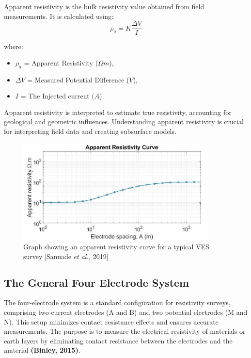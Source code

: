 \documentclass[12pt,a4paper]{report}
\begin{document}
Apparent resistivity is the bulk resistivity value obtained from field measurements. It is calculated using:
\begin{equation}
\rho_a = K \frac{\Delta V}{I}
\end{equation}

where:
\begin{itemize}
    \item $\rho_a$ = Apparent Resistivity ($\Omega m$),
    \item $\Delta V$ = Measured Potential Difference ($V$),
    \item $I$ = The Injected current ($A$).
\end{itemize}

Apparent resistivity is interpreted to estimate true resistivity, accounting for geological and geometric influences. Understanding apparent resistivity is crucial for interpreting field data and creating subsurface models.

\begin{figure}[H]
    \centering
    \includegraphics[width=0.90\textwidth]{Apparent-resistivity-curve-for-a-two-layer-model.png}
    \caption{Graph showing an apparent resistivity curve for a typical VES survey [Sanuade \textit{et al.,} 2019]}
\end{figure}

\subsection{The General Four Electrode System}

The four-electrode system is a standard configuration for resistivity surveys, comprising two current electrodes (A and B) and two potential electrodes (M and N). This setup minimizes contact resistance effects and ensures accurate measurements. The purpose is to measure the electrical resistivity of materials or earth layers by eliminating contact resistance between the electrodes and the material \textbf{(Binley, 2015)}.
\end{document}
